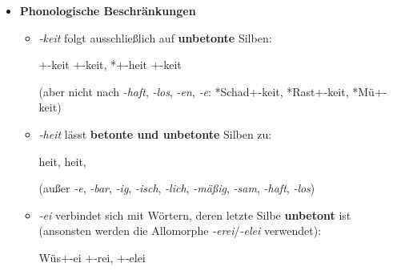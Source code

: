 \begin{frame}

\begin{itemize}
\item \textbf{Phonologische Beschränkungen}

\begin{itemize}
\item \emph{-keit} folgt ausschließlich auf \textbf{unbetonte} Silben: 				

\ea {}$+$-keit \vs *$+$-keit, *$+$-heit \vs {}$+$-keit
\z

(aber nicht nach \emph{-haft}, \emph{-los}, \emph{-en}, \emph{-e}: *Schad$+$-keit, *Rast$+$-keit, *Mü$+$-keit)

\pause 
\medskip 

\item \textit{-heit} lässt \textbf{betonte und unbetonte} Silben zu: 

\ea {}heit, heit, 
\z

(außer \emph{-e}, \emph{-bar}, \emph{-ig}, \emph{-isch}, \emph{-lich}, \emph{-mäßig}, \emph{-sam}, \emph{-haft}, \emph{-los})

\pause 
\medskip 

\item \emph{-ei} verbindet sich mit Wörtern, deren letzte Silbe \textbf{unbetont} ist (ansonsten werden die Allomorphe \emph{-erei}/\emph{-elei} verwendet): 

\ea Wüs$+$-ei \vs {}$+$-rei, $+$-elei
\z

\end{itemize}

\end{itemize}

\end{frame}


